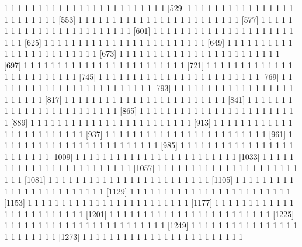 \documentclass[11pt]{article}
\begin{document}
\begin{Schunk}
\begin{Soutput}
  [505]  1  1  1  1  1  1  1  1  1  1  1  1  1  1  1  1  1  1  1  1  1  1  1  1
  [529]  1  1  1  1  1  1  1  1  1  1  1  1  1  1  1  1  1  1  1  1  1  1  1  1
  [553]  1  1  1  1  1  1  1  1  1  1  1  1  1  1  1  1  1  1  1  1  1  1  1  1
  [577]  1  1  1  1  1  1  1  1  1  1  1  1  1  1  1  1  1  1  1  1  1  1  1  1
  [601]  1  1  1  1  1  1  1  1  1  1  1  1  1  1  1  1  1  1  1  1  1  1  1  1
  [625]  1  1  1  1  1  1  1  1  1  1  1  1  1  1  1  1  1  1  1  1  1  1  1  1
  [649]  1  1  1  1  1  1  1  1  1  1  1  1  1  1  1  1  1  1  1  1  1  1  1  1
  [673]  1  1  1  1  1  1  1  1  1  1  1  1  1  1  1  1  1  1  1  1  1  1  1  1
  [697]  1  1  1  1  1  1  1  1  1  1  1  1  1  1  1  1  1  1  1  1  1  1  1  1
  [721]  1  1  1  1  1  1  1  1  1  1  1  1  1  1  1  1  1  1  1  1  1  1  1  1
  [745]  1  1  1  1  1  1  1  1  1  1  1  1  1  1  1  1  1  1  1  1  1  1  1  1
  [769]  1  1  1  1  1  1  1  1  1  1  1  1  1  1  1  1  1  1  1  1  1  1  1  1
  [793]  1  1  1  1  1  1  1  1  1  1  1  1  1  1  1  1  1  1  1  1  1  1  1  1
  [817]  1  1  1  1  1  1  1  1  1  1  1  1  1  1  1  1  1  1  1  1  1  1  1  1
  [841]  1  1  1  1  1  1  1  1  1  1  1  1  1  1  1  1  1  1  1  1  1  1  1  1
  [865]  1  1  1  1  1  1  1  1  1  1  1  1  1  1  1  1  1  1  1  1  1  1  1  1
  [889]  1  1  1  1  1  1  1  1  1  1  1  1  1  1  1  1  1  1  1  1  1  1  1  1
  [913]  1  1  1  1  1  1  1  1  1  1  1  1  1  1  1  1  1  1  1  1  1  1  1  1
  [937]  1  1  1  1  1  1  1  1  1  1  1  1  1  1  1  1  1  1  1  1  1  1  1  1
  [961]  1  1  1  1  1  1  1  1  1  1  1  1  1  1  1  1  1  1  1  1  1  1  1  1
  [985]  1  1  1  1  1  1  1  1  1  1  1  1  1  1  1  1  1  1  1  1  1  1  1  1
 [1009]  1  1  1  1  1  1  1  1  1  1  1  1  1  1  1  1  1  1  1  1  1  1  1  1
 [1033]  1  1  1  1  1  1  1  1  1  1  1  1  1  1  1  1  1  1  1  1  1  1  1  1
 [1057]  1  1  1  1  1  1  1  1  1  1  1  1  1  1  1  1  1  1  1  1  1  1  1  1
 [1081]  1  1  1  1  1  1  1  1  1  1  1  1  1  1  1  1  1  1  1  1  1  1  1  1
 [1105]  1  1  1  1  1  1  1  1  1  1  1  1  1  1  1  1  1  1  1  1  1  1  1  1
 [1129]  1  1  1  1  1  1  1  1  1  1  1  1  1  1  1  1  1  1  1  1  1  1  1  1
 [1153]  1  1  1  1  1  1  1  1  1  1  1  1  1  1  1  1  1  1  1  1  1  1  1  1
 [1177]  1  1  1  1  1  1  1  1  1  1  1  1  1  1  1  1  1  1  1  1  1  1  1  1
 [1201]  1  1  1  1  1  1  1  1  1  1  1  1  1  1  1  1  1  1  1  1  1  1  1  1
 [1225]  1  1  1  1  1  1  1  1  1  1  1  1  1  1  1  1  1  1  1  1  1  1  1  1
 [1249]  1  1  1  1  1  1  1  1  1  1  1  1  1  1  1  1  1  1  1  1  1  1  1  1
 [1273]  1  1  1  1  1  1  1  1  1  1  1  1  1  1  1  1  1  1  1  1  1  1  1  1

\end{Soutput}
\end{Schunk}
\end{document}
